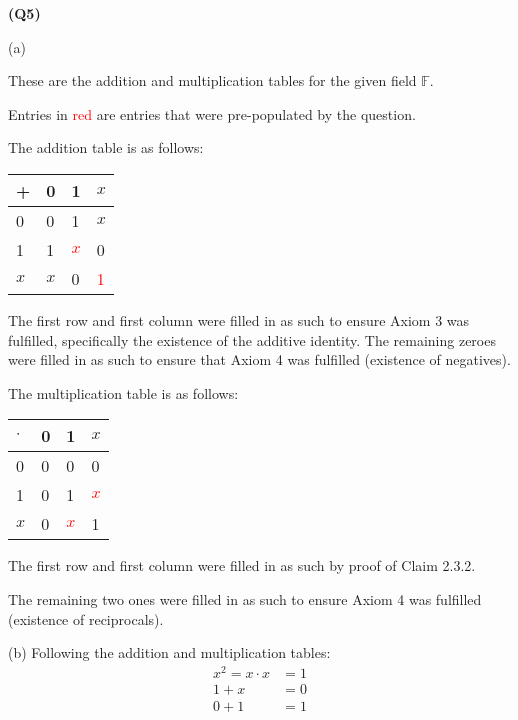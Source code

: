 \documentclass[12pt, a4paper]{article}
\newcommand{\F}{\mathbb{F}}
\newcommand{\red}[1]{\textcolor{red}{#1}}
\begin{document}
\noindent\textbf{(Q5)}

\noindent(a)

These are the addition and multiplication tables for the given field $\F$.

Entries in \red{red} are entries that were pre-populated by the question.

The addition table is as follows: \hfill\break

\begin{tabular}{ |m{1cm} | m{1cm} | m{1cm} | m{1cm}|}
    \hline
    + & 0 & 1 & $x$\\
    \hline
    0 & 0 & 1 & $x$\\
    \hline
    1 & 1 & \red{$x$} & 0\\
    \hline
    $x$ & $x$ & 0 & \red{1}\\
    \hline
\end{tabular}
\hfill\break

The first row and first column were filled in as such to ensure Axiom 3 was 
fulfilled, specifically the existence of the additive identity. The remaining
zeroes were  filled in as such to ensure that Axiom 4 was fulfilled
(existence of negatives).

The multiplication table is as follows: \hfill\break

\begin{tabular}{ |m{1cm} | m{1cm} | m{1cm} | m{1cm}|}
    \hline
    $\cdot$ & 0 & 1 & $x$\\
    \hline
    0 & 0 & 0 & 0\\
    \hline
    1 & 0 & 1 & \red{$x$}\\
    \hline
    $x$ & 0 & \red{$x$} & 1\\
    \hline
\end{tabular}
\hfill\break

The first row and first column were filled in as such by proof of Claim 2.3.2.

The remaining two ones were filled in as such to ensure Axiom 4 was fulfilled
(existence of reciprocals).

(b)
Following the addition and multiplication tables:
\begin{align*}
    x^2 = x \cdot x & = 1\\
    1 + x & = 0\\
    0 + 1 & = 1
\end{align*}
\end{document}
